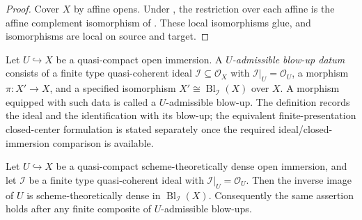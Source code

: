 \begin{proof}
  Cover $X$ by affine opens.  Under
  , the restriction over each
  affine is the affine complement isomorphism of
  .  These local isomorphisms glue,
  and isomorphisms are local on source and target.
\end{proof}

\begin{definition}
  \label{def:nagata-admissible-blowup}

  Let $U\hookrightarrow X$ be a quasi-compact open immersion.  A
  \emph{$U$-admissible blow-up datum} consists of a finite type
  quasi-coherent ideal $\mathcal I\subseteq\mathcal O_X$ with
  $\mathcal I|_U=\mathcal O_U$, a morphism
  $\pi\colon X'\to X$, and a specified isomorphism
  $X'\cong\operatorname{Bl}_{\mathcal I}(X)$ over $X$.  A morphism equipped
  with such data is called a $U$-admissible blow-up.  The definition records
  the ideal and the identification with its blow-up; the equivalent
  finite-presentation closed-center formulation is stated separately once
  the required ideal/closed-immersion comparison is available.
\end{definition}

\begin{lemma}
  \label{lemma:nagata-admissible-blowup-preserves-density}

  Let $U\hookrightarrow X$ be a quasi-compact scheme-theoretically dense open
  immersion, and let $\mathcal I$ be a finite type quasi-coherent ideal with
  $\mathcal I|_U=\mathcal O_U$.  Then the inverse image of $U$ is
  scheme-theoretically dense in $\operatorname{Bl}_{\mathcal I}(X)$.
  Consequently the same assertion holds after any finite composite of
  $U$-admissible blow-ups.
\end{lemma}

